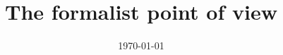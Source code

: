\setcounter{secnumdepth}{3} %
\newcommand{\bnl}{\\ \noindent}
\newcommand{\specialcell}[2][c]{%
\begin{tabular}[#1]{@{}l@{}}#2\end{tabular}}

\newcommand{\smath}[1]{ {\setlength{\mathindent}{0cm} \begin{equation} #1\end{equation}}%
}

\DeclarePairedDelimiter\abs{\lvert}{\rvert}%
\DeclarePairedDelimiter\norm{\lVert}{\rVert}%
\makeatletter
\let\oldabs\abs
\def\abs{\@ifstar{\oldabs}{\oldabs*}}
%
\let\oldnorm\norm
\def\norm{\@ifstar{\oldnorm}{\oldnorm*}}
\makeatother



	\title{The formalist point of view}
	\date{\today}

	\maketitle
	
	\newpage
	\tableofcontents
	\newpage
	\raggedbottom
	
	
	


